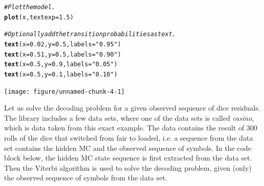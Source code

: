 \documentclass{article}\usepackage[]{graphicx}\usepackage[]{color}
\makeatletter
\newcommand{\hlnum}[1]{\textcolor[rgb]{0.686,0.059,0.569}{#1}}%
\newcommand{\hlstr}[1]{\textcolor[rgb]{0.192,0.494,0.8}{#1}}%
\newcommand{\hlcom}[1]{\textcolor[rgb]{0.678,0.584,0.686}{\textit{#1}}}%
\newcommand{\hlstd}[1]{\textcolor[rgb]{0.345,0.345,0.345}{#1}}%
\newcommand{\hlkwc}[1]{\textcolor[rgb]{0.333,0.667,0.333}{#1}}%
\newcommand{\hlkwd}[1]{\textcolor[rgb]{0.737,0.353,0.396}{\textbf{#1}}}%
\newenvironment{kframe}{%
 \def\at@end@of@kframe{}%
 \ifinner\ifhmode%
  \def\at@end@of@kframe{\end{minipage}}%
  \begin{minipage}{\columnwidth}%
 \fi\fi%
 \def\FrameCommand##1{\hskip\@totalleftmargin \hskip-\fboxsep
 \colorbox{shadecolor}{##1}\hskip-\fboxsep
     \hskip-\linewidth \hskip-\@totalleftmargin \hskip\columnwidth}%
 \MakeFramed {\advance\hsize-\width
   \@totalleftmargin\z@ \linewidth\hsize
   \@setminipage}}%
 {\par\unskip\endMakeFramed%
 \at@end@of@kframe}
\newenvironment{knitrout}{}{} %
\makeatother
\begin{document}
\begin{center}
\begin{knitrout}
\begin{kframe}
\begin{alltt}
\hlcom{# Plot the model.}
\hlkwd{plot}\hlstd{(x,} \hlkwc{textexp} \hlstd{=} \hlnum{1.5}\hlstd{)}

\hlcom{# Optionally add the transition probabilities as text.}
\hlkwd{text}\hlstd{(}\hlkwc{x} \hlstd{=} \hlnum{0.02}\hlstd{,} \hlkwc{y} \hlstd{=} \hlnum{0.5}\hlstd{,} \hlkwc{labels} \hlstd{=} \hlstr{"0.95"}\hlstd{)}
\hlkwd{text}\hlstd{(}\hlkwc{x} \hlstd{=} \hlnum{0.51}\hlstd{,} \hlkwc{y} \hlstd{=} \hlnum{0.5}\hlstd{,} \hlkwc{labels} \hlstd{=} \hlstr{"0.90"}\hlstd{)}
\hlkwd{text}\hlstd{(}\hlkwc{x} \hlstd{=} \hlnum{0.5}\hlstd{,} \hlkwc{y} \hlstd{=} \hlnum{0.9}\hlstd{,} \hlkwc{labels} \hlstd{=} \hlstr{"0.05"}\hlstd{)}
\hlkwd{text}\hlstd{(}\hlkwc{x} \hlstd{=} \hlnum{0.5}\hlstd{,} \hlkwc{y} \hlstd{=} \hlnum{0.1}\hlstd{,} \hlkwc{labels} \hlstd{=} \hlstr{"0.10"}\hlstd{)}
\end{alltt}
\end{kframe}
\texttt{[image: figure/unnamed-chunk-4-1]} 
\end{knitrout}
\end{center}

Let us solve the decoding problem for a given observed sequence of dice residuals. The library includes a few data sets, where one of the data sets is called \textit{casino}, which is data taken from this exact example. The data contains the result of 300 rolls of the dice that switched from fair to loaded, i.e. a sequence from the data set contains the hidden MC and the observed sequence of symbols. In the code block below, the hidden MC state sequence is first extracted from the data set. Then the Viterbi algorithm is used to solve the decoding problem, given (only) the observed sequence of symbols from the data set. 
\end{document}
